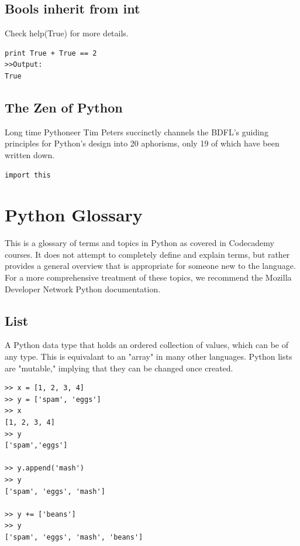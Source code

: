 \documentclass[12pt,a4paper,final,twoside,onecolumn,titlepage]{book}
\begin{document}
\section{Bools inherit from int}
Check help(True) for more details.
\begin{lstlisting}
print True + True == 2
>>Output:
True
\end{lstlisting}


\section{The Zen of Python}
Long time Pythoneer Tim Peters succinctly channels the BDFL's guiding principles for Python's design into 20 aphorisms, only 19 of which have been written down.
\begin{lstlisting}
import this
\end{lstlisting}

\chapter{Python Glossary}
This is a glossary of terms and topics in Python as covered in Codecademy courses. It does not attempt to completely define and explain terms, but rather provides a general overview that is appropriate for someone new to the language. For a more comprehensive treatment of these topics, we recommend the Mozilla Developer Network Python documentation.

\section{List}
 A Python data type that holds an ordered collection of values, which can be of any type. This is equivalant to an "array" in many other languages. Python lists are "mutable," implying that they can be changed once created.
\lstset{language=Python, tabsize=4}
\begin{lstlisting}
>> x = [1, 2, 3, 4]
>> y = ['spam', 'eggs']
>> x
[1, 2, 3, 4]
>> y
['spam','eggs']

>> y.append('mash')
>> y
['spam', 'eggs', 'mash']

>> y += ['beans']
>> y
['spam', 'eggs', 'mash', 'beans']
\end{lstlisting}
\end{document}
